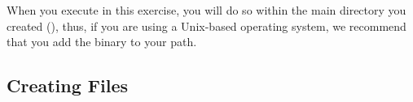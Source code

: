 When you execute \RevBayes in this exercise, you will do so within the main directory you created (), thus, if you are using a Unix-based operating system, we recommend that you add the \RevBayes binary to your path.


%
%

\bigskip

\subsection{Creating \Rev Files}\label{subsect:Exercise-CreatingFiles}

